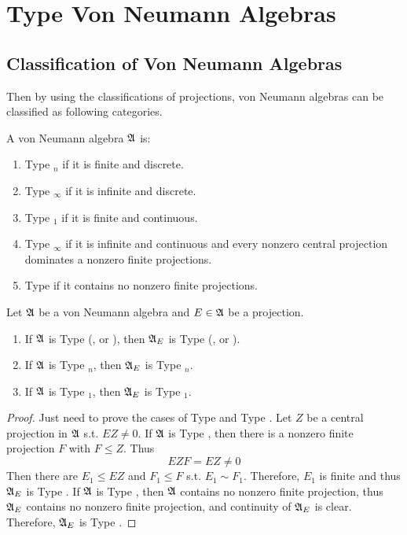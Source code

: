 \section{Type \texorpdfstring{}{I} Von Neumann Algebras}

\subsection{Classification of Von Neumann Algebras}

Then by using the classifications of projections, von Neumann algebras can be classified as following categories.

\begin{defn}
	A von Neumann algebra $\mathfrak{A}$ is:
	\begin{enumerate}[label = \arabic*)]
		\item Type $_n$ if it is finite and discrete.
		\item Type $_{\infty}$ if it is infinite and discrete.
		\item Type $_1$ if it is finite and continuous.
		\item Type $_{\infty}$ if it is infinite and continuous and every nonzero central projection dominates a nonzero finite projections.
		\item Type  if it contains no nonzero finite projections.
	\end{enumerate}
\end{defn}

\begin{prop}
	Let $\mathfrak{A}$ be a von Neumann algebra and $E \in \mathfrak{A}$ be a projection.
	\begin{enumerate}[label = \arabic*)]
		\item If $\mathfrak{A}$ is Type  (, or ), then $\mathfrak{A}_E$ is Type  (, or ).
		\item If $\mathfrak{A}$ is Type $_n$, then $\mathfrak{A}_E$ is Type $_n$.
		\item If $\mathfrak{A}$ is Type $_1$, then $\mathfrak{A}_E$ is Type $_1$.
	\end{enumerate}
\end{prop}
\begin{proof}
	Just need to prove the cases of Type  and Type . Let $Z$ be a central projection in $\mathfrak{A}$ s.t. $EZ \neq 0$. If $\mathfrak{A}$ is Type , then there is a nonzero finite projection $F$ with $F \leqslant Z$. Thus
	 \begin{equation*}
		EZF = EZ \neq 0
	\end{equation*}
	Then there are $E_1 \leqslant EZ$ and $F_1 \leqslant F$ s.t. $E_1 \sim F_1$. Therefore, $E_1$ is finite and thus $\mathfrak{A}_E$ is Type . If $\mathfrak{A}$ is Type , then $\mathfrak{A}$ contains no nonzero finite projection, thus $\mathfrak{A}_E$ contains no nonzero finite projection, and continuity of $\mathfrak{A}_E$ is clear. Therefore, $\mathfrak{A}_E$ is Type .
\end{proof}

